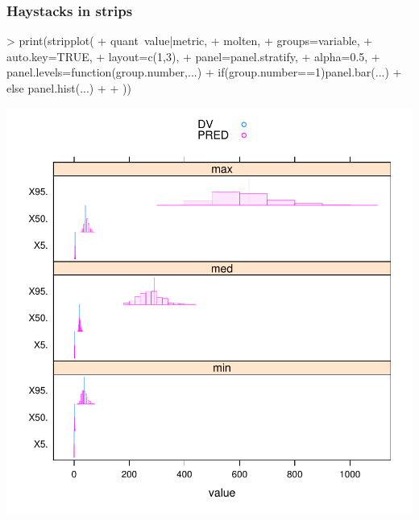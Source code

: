 \subsubsection{Haystacks in strips}
\begin{Schunk}
\begin{Sinput}
> print(stripplot(
+ 	quant~value|metric,
+ 	molten,
+ 	groups=variable,
+ 	auto.key=TRUE,
+ 	layout=c(1,3),
+ 	panel=panel.stratify,
+ 	alpha=0.5,
+ 	panel.levels=function(group.number,...){
+ 		if(group.number==1)panel.bar(...)
+ 		else panel.hist(...)
+ 	}
+ ))
\end{Sinput}
\end{Schunk}
\includegraphics{model1-strippedHaystack}
